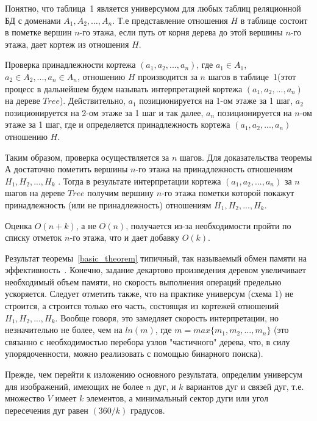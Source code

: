 
Понятно, что таблица~1 является универсумом для любых таблиц реляционной БД с доменами $A_1, A_2,\ldots,A_n$. Т.е представление отношения $H$ в таблице состоит в пометке вершин $n$-го этажа, если путь от корня дерева до этой вершины $n$-го этажа, дает кортеж из отношения $H$.

Проверка принадлежности кортежа $(a_1,a_2, ..., a_n)$, где $a_1 \in A_1$, $a_2 \in A_2, ..., a_n \in A_n$, отношению $H$ производится за $n$ шагов в таблице~1(этот процесс в дальнейшем будем называть интерпретацией кортежа $(a_1,a_2, ..., a_n)$ на дереве $Tree$). Действительно, $a_1$ позиционируется на 1-ом этаже за 1 шаг, $a_2$ позиционируется на 2-ом этаже за 1 шаг и так далее, $a_n$ позиционируется на $n$-ом этаже за 1 шаг, где и определяется принадлежность кортежа $(a_1,a_2, ..., a_n)$ отношению $H$.

Таким образом, проверка осуществляется за $n$ шагов. Для доказательства теоремы $А$ достаточно пометить вершины $n$-го этажа на принадлежность отношениям $H_1, H_2, ..., H_k$ . Тогда в результате интерпретации кортежа $(a_1,a_2, ..., a_n)$ за $n$ шагов на дереве $Tree$ получим вершину $n$-го этажа пометки которой покажут принадлежность (или не принадлежность) отношениям $H_1, H_2, ..., H_k$.

Оценка $O(n+k)$, а не $O(n)$, получается из-за необходимости пройти по списку отметок $n$-го этажа, что и дает добавку $O(k)$.

\begin{remark}
Результат теоремы~\ref{basic_theorem} типичный, так называемый обмен памяти на эффективность~\cite{D11}.
Конечно, задание декартово произведения деревом увеличивает необходимый объем памяти, но скорость выполнения операций предельно ускоряется. Следует отметить также, что на практике универсум (схема 1) не строится, а строится только его часть, состоящая из кортежей отношений $H_1, H_2, ..., H_k$. Вообще говоря, это замедляет скорость интерпретации, но незначительно не более, чем на $ln(m)$, где $m = max\{ m_1, m_2, …, m_n\}$ 
(это связанно с необходимостью перебора узлов "частичного" дерева, что, в силу упорядоченности, можно реализовать с помощью бинарного поиска).
\end{remark}

Прежде, чем перейти к изложению основного результата, определим универсум для изображений, имеющих не более $n$ дуг, и $k$ вариантов дуг и связей дуг, т.е. множество $V$ имеет $k$ элементов, а минимальный сектор дуги или угол пересечения дуг равен $(360/k)$ градусов.

